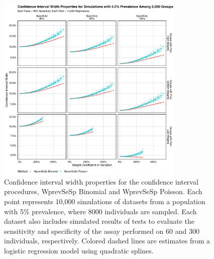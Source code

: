 \begin{figure}
\centering
\includegraphics[width=0.8\textwidth]{imperfect_confidence_interval_width_8000_groups_0_05_prev}
\caption{Confidence interval width properties for the confidence interval procedures, WprevSeSp Binomial and WprevSeSp Poisson.
Each point represents 10,000 simulations of datasets from a population with 5\% prevalence, where 8000 individuals are sampled.
Each dataset also includes simulated results of tests to evaluate the sensitivity and specificity of the assay performed on 60 and 300 individuals, respectively.
Colored dashed lines are estimates from a logistic regression model using quadratic splines.}
\label{ch_3:fig:imperfect_confidence_interval_width_8000_groups_0_05_prev}
\end{figure}

